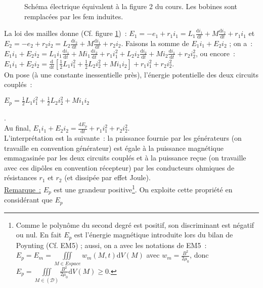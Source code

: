 \documentclass{article}
\newcommand{\mathcolorbox}[2]{\colorbox{#1}{$#2$}}
\let\oldiiint\iiint
\renewcommand{\iiint}{\oldiiint\limits}
\begin{document}
\begin{figure}[h]
\begin{center}
\end{center}
\caption{Schéma électrique équivalent à la figure 2 du cours. Les
bobines sont remplacées par les fem induites.}\label{Fig.6}
\end{figure}

La loi des mailles donne (Cf. figure \ref{Fig.6}) : $E_{1} =
-e_{1}+r_{1}i_{1} =
L_{1}\frac{\mathrm{d}i_{1}}{\mathrm{d}t}+M\frac{\mathrm{d}i_{2}}{\mathrm{d}t}+r_{1}i_{1}$ et $E_{2} =
-e_{2}+r_{2}i_{2} =
L_{2}\frac{\mathrm{d}i_{2}}{\mathrm{d}t}+M\frac{\mathrm{d}i_{1}}{\mathrm{d}t}+r_{2}i_{2}$. Faisons la
somme de $E_{1}i_{1}+E_{2}i_{2}$ ; on a : \\
$E_{1}i_{1}+E_{2}i_{2} =
L_{1}i_{1}\frac{\mathrm{d}i_{1}}{\mathrm{d}t}+Mi_{1}\frac{\mathrm{d}i_{2}}{\mathrm{d}t}+r_{1}i_{1}^{2}+
L_{2}i_{2}\frac{\mathrm{d}i_{2}}{\mathrm{d}t}+Mi_{2}\frac{\mathrm{d}i_{1}}{\mathrm{d}t}+r_{2}i_{2}^{2}$,
ou encore : \\
$E_{1}i_{1}+E_{2}i_{2} =
\frac{\mathrm{d}}{\mathrm{d}t}\left[\frac{1}{2}L_{1}i_{1}^{2}+\frac{1}{2}L_{2}i_{2}^{2}
+Mi_{1}i_{2}\right]+ r_{1}i_{1}^{2}+r_{2}i_{2}^{2}$. \\
On pose (à une constante inessentielle près), l'énergie potentielle
des deux circuits couplés : \\
\centerline{\mathcolorbox{gray!20}{E_{p} = \frac{1}{2}L_{1}i_{1}^{2}+\frac{1}{2}L_{2}i_{2}^{2} +
Mi_{1}i_{2}}}.
\\
Au final, $E_{1}i_{1}+E_{2}i_{2} = \frac{\mathrm{d}E_{p}}{\mathrm{d}t}+r_{1}i_{1}^{2}
+r_{2}i_{2}^{2}$. \\
L'interprétation est la suivante : la puissance fournie par les
générateurs (on travaille en convention générateur) est égale à la
puissance magnétique emmagasinée par les deux circuits couplés et à
la puissance reçue (on travaille avec ces dipôles en convention
récepteur) par les conducteurs ohmiques de résistances $r_{1}$ et
$r_{2}$ (et dissipée par effet Joule). \\
\underline{Remarque :} $E_{p}$ est une grandeur
positive\footnote{Comme le polynôme du second degré est positif, son
discriminant est négatif ou nul. En fait $E_{p}$ est l'énergie
magnétique introduite lors du bilan de Poynting (Cf. EM5) ; aussi,
on a avec les notations de EM5 : $E_{p} = E_{m} = \iiint_{M\in
Espace}w_{m}(M,t)\mathrm{d}V(M)$ avec $w_{m} = \frac{B^{2}}{2\mu_{0}}$, donc
$E_{p} = \iiint_{M \in (\mathcal{D})} \frac{B^{2}}{2\mu_{0}}\mathrm{d}V(M)
\geq 0$.}. On exploite cette propriété en considérant que $E_{p}$
\end{document}
